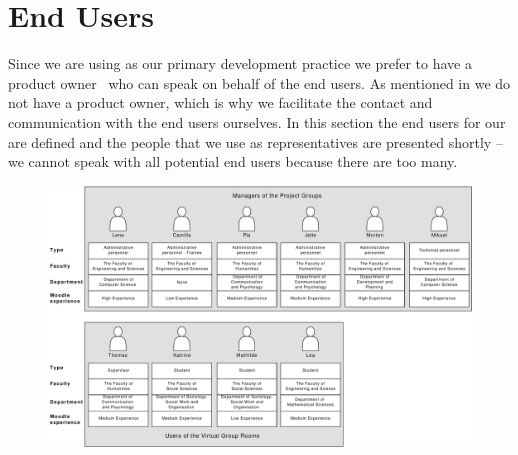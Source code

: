 \section{End Users}
\label{sec:enduser}
Since we are using \scrum{} as our primary development practice we prefer to have a product owner~\cite[p.~115]{Larman04} who can speak on behalf of the end users.
As mentioned in  we do not have a product owner, which is why we facilitate the contact and communication with the end users ourselves.
In this section the end users for our \subsystem{} are defined and the people that we use as representatives are presented shortly -- we cannot speak with all potential end users because there are too many.

\begin{landscape}
\begin{figure}[p]%
\includegraphics[scale=0.50]{images/UserGroups2}%
%
\label{fig:usergroup}%
\end{figure}
\end{landscape}

